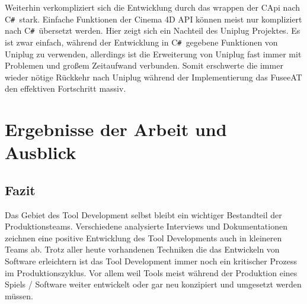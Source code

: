 \documentclass[pagesize, paper=a4, fontsize=12pt, titlepage=true, headings=small, headnosepline, abstractoff, liststotoc, nochapterprefix, plainheadsepline, twoside]{scrreprt}
\newcommand{\CSS}{C\texttt{\# }}
\newcommand{\CPP}{C\nolinebreak\hspace{-.05em}\raisebox{.4ex}{\tiny\bf +}\nolinebreak\hspace{-.10em}\raisebox{.4ex}{\tiny\bf +}}
\begin{document}
Weiterhin verkompliziert sich die Entwicklung durch das wrappen der \CPP Api nach \CSS stark. Einfache Funktionen der Cinema 4D API können meist nur kompliziert nach \CSS übersetzt werden. Hier zeigt sich ein Nachteil des Uniplug Projektes. Es ist zwar einfach, während der Entwicklung in \CSS gegebene Funktionen von Uniplug zu verwenden, allerdings ist die Erweiterung von Uniplug fast immer mit Problemen und großem Zeitaufwand verbunden. Somit erschwerte die immer wieder nötige Rückkehr nach Uniplug während der Implementierung das FuseeAT den effektiven Fortschritt massiv.






\chapter{Ergebnisse der Arbeit und Ausblick}

\section{Fazit}
Das Gebiet des Tool Development selbst bleibt ein wichtiger Bestandteil der Produktionsteams. Verschiedene analysierte Interviews und Dokumentationen zeichnen eine positive Entwicklung des Tool Developments auch in kleineren Teams ab. Trotz aller heute vorhandenen Techniken die das Entwickeln von Software erleichtern ist das Tool Development immer noch ein kritischer Prozess im Produktionszyklus. Vor allem weil Tools meist während der Produktion eines Spiels / Software weiter entwickelt oder gar neu konzipiert und umgesetzt werden müssen. \\
\end{document}

